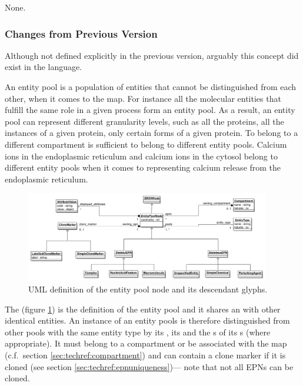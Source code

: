None.

\subsubsection{Changes from Previous Version}

Although not defined explicitly in the previous version, arguably this
concept did exist in the language.

\label{sec:techref:EPNs}\label{defn:EntityPoolNode}\label{sec:techref:EPN}

An entity pool is a population of entities that cannot be
distinguished from each other, when it comes to the \SBGNPDLone
map. For instance all the molecular entities that fulfill the same
role in a given process form an entity pool. As a result, an entity
pool can represent different granularity levels, such as all the
proteins, all the instances of a given protein, only certain forms of
a given protein. To belong to a different compartment is sufficient to
belong to different entity pools. Calcium ions in the endoplasmic
reticulum and calcium ions in the cytosol belong to different entity
pools when it comes to representing calcium release from the
endoplasmic reticulum.

\begin{figure}[htb]
  \centering
  \includegraphics[width=0.95\textwidth]{images/epnuml}
\caption{UML definition of the entity pool node and its descendant glyphs.}
  \label{fig:techref:epnuml}
\end{figure}

The  (figure \ref{fig:techref:epnuml}) is the
definition of the entity pool and it shares an 
with other identical entities. An instance of an entity pools is
therefore distinguished from other pools with the same entity type by
its , its  and the
s of its s (where
appropriate). It must belong to a compartment or be associated with
the map (c.f.\, section \ref{sec:techref:compartment}) and can contain a clone
marker if it is cloned (see section \ref{sec:techref:epnuniqueness})--- note
that not all EPNs can be cloned.

